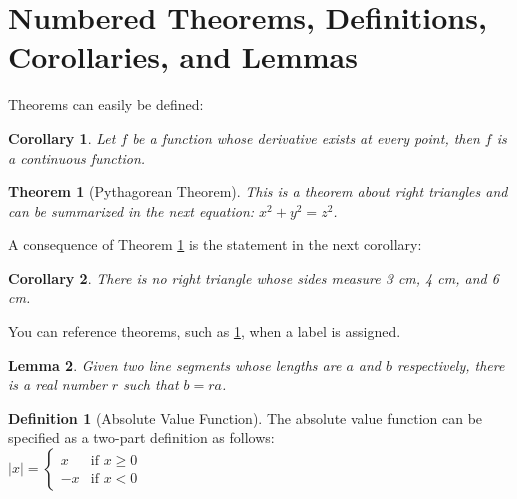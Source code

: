 \documentclass{article}
\newtheorem{theorem}{Theorem}[section]
\newtheorem{corollary}{Corollary}[theorem]
\newtheorem{lemma}[theorem]{Lemma}
\theoremstyle{definition}
\newtheorem{definition}{Definition}[section]
\begin{document}
	\section{Numbered Theorems, Definitions, Corollaries, and Lemmas}
	Theorems can easily be defined:
	\begin{corollary}
		Let $f$ be a function whose derivative exists at every point, then $f$ is a continuous function.
	\end{corollary}
	\begin{theorem}[Pythagorean Theorem]
		\label{pythagorean}
		This is a theorem about right triangles and can be summarized in the next equation:
		$x^2 + y^2 = z^2$.
	\end{theorem}
	A consequence of Theorem \ref{pythagorean} is the statement in the next corollary:
	\begin{corollary}
		There is no right triangle whose sides measure 3 cm, 4 cm, and 6 cm.
	\end{corollary}
	You can reference theorems, such as \ref{pythagorean}, when a label is assigned.
	\begin{lemma}
		Given two line segments whose lengths are $a$ and $b$ respectively, there is a real number $r$ such that $b = ra$.
	\end{lemma}
	\begin{definition}[Absolute Value Function]
		The absolute value function can be specified as a two-part definition as follows:\\
		$|x| = 
		\left\{
		\begin{array}{ll}
			x & \mbox{if } x \geq 0 \\ 
			-x & \mbox{if } x < 0 
		\end{array}
		\right.$
	\end{definition}
\end{document}

